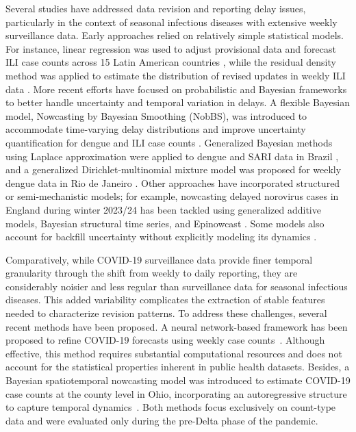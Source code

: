 Several studies have addressed data revision and reporting delay issues, particularly in the context of seasonal infectious diseases with extensive weekly surveillance data. Early approaches relied on relatively simple statistical models. For instance, linear regression was used to adjust provisional data and forecast ILI case counts across 15 Latin American countries \cite{chakraborty2014forecasting}, while the residual density method was applied to estimate the distribution of revised updates in weekly ILI data \cite{brooks2018nonmechanistic}. More recent efforts have focused on probabilistic and Bayesian frameworks to better handle uncertainty and temporal variation in delays. A flexible Bayesian model, Nowcasting by Bayesian Smoothing (NobBS), was introduced to accommodate time-varying delay distributions and improve uncertainty quantification for dengue and ILI case counts \cite{McGough2020}. Generalized Bayesian methods using Laplace approximation were applied to dengue and SARI data in Brazil \cite{bastos2019modelling}, and a generalized Dirichlet-multinomial mixture model was proposed for weekly dengue data in Rio de Janeiro \cite{stoner2020multivariate}. Other approaches have incorporated structured or semi-mechanistic models; for example, nowcasting delayed norovirus cases in England during winter 2023/24 has been tackled using generalized additive models, Bayesian structural time series, and Epinowcast \cite{van2019nowcasting, epinowcast}. Some models also account for backfill uncertainty without explicitly modeling its dynamics \cite{osthus2019even}.

Comparatively, while COVID-19 surveillance data provide finer temporal granularity through the shift from weekly to daily reporting, they are considerably noisier and less regular than surveillance data for seasonal infectious diseases. This added variability complicates the extraction of stable features needed to characterize revision patterns. To address these challenges, several recent methods have been proposed. A neural network-based framework has been proposed to refine COVID-19 forecasts using weekly case counts~\cite{kamarthi2021back2future}. Although effective, this method requires substantial computational resources and does not account for the statistical properties inherent in public health datasets. Besides, a Bayesian spatiotemporal nowcasting model was introduced to estimate COVID-19 case counts at the county level in Ohio, incorporating an autoregressive structure to capture temporal dynamics~\cite{kline2022bayesian}. Both methods focus exclusively on count-type data and were evaluated only during the pre-Delta phase of the pandemic.

